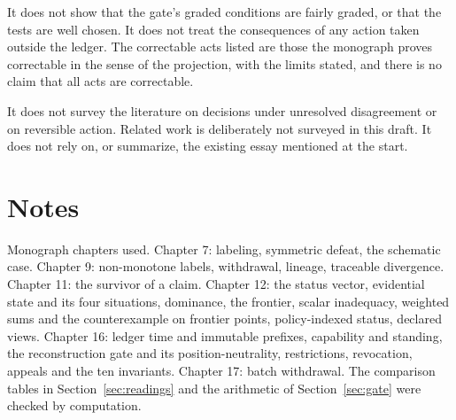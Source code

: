 \documentclass[11pt]{article}
\begin{document}
It does not show that the gate's graded conditions are fairly graded, or that the tests are well chosen. It does not treat the consequences of any action taken outside the ledger. The correctable acts listed are those the monograph proves correctable in the sense of the projection, with the limits stated, and there is no claim that all acts are correctable.

It does not survey the literature on decisions under unresolved disagreement or on reversible action. Related work is deliberately not surveyed in this draft. It does not rely on, or summarize, the existing essay mentioned at the start.

\section*{Notes}

Monograph chapters used. Chapter 7: labeling, symmetric defeat, the schematic case. Chapter 9: non-monotone labels, withdrawal, lineage, traceable divergence. Chapter 11: the survivor of a claim. Chapter 12: the status vector, evidential state and its four situations, dominance, the frontier, scalar inadequacy, weighted sums and the counterexample on frontier points, policy-indexed status, declared views. Chapter 16: ledger time and immutable prefixes, capability and standing, the reconstruction gate and its position-neutrality, restrictions, revocation, appeals and the ten invariants. Chapter 17: batch withdrawal. The comparison tables in Section~\ref{sec:readings} and the arithmetic of Section~\ref{sec:gate} were checked by computation.
\end{document}
